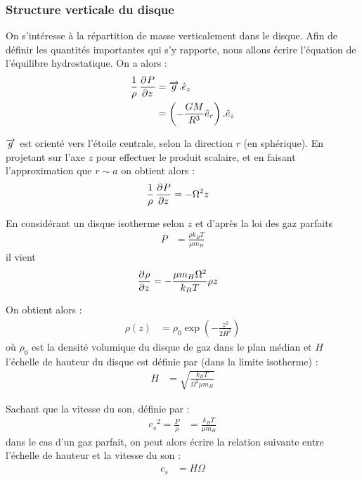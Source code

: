 \subsubsection{Structure verticale du disque}
On s'intéresse à la répartition de masse verticalement dans le disque. Afin de définir les quantités importantes qui s'y rapporte, nous allons écrire l'équation de l'équilibre hydrostatique. On a alors :
\begin{align}
\frac{1}{\rho}\mathinner{ \dfrac{\partial{^{}}P}{\partial{{z}^{}}} } &= {\overrightarrow{g}}.\hat{e}_z\\
&= \left(-\frac{GM}{R^3}\hat{e}_r\right).\hat{e}_z
\end{align}

${\overrightarrow{g}}$ est orienté vers l'étoile centrale, selon la direction $r$ (en sphérique). En projetant sur l'axe $z$ pour effectuer le produit scalaire, et en faisant l'approximation que $r\sim a$ on obtient alors :
\begin{align}
\frac{1}{\rho}\mathinner{ \dfrac{\partial{^{}}P}{\partial{{z}^{}}} } &= -\Omega^2 z
\end{align}

En considérant un disque isotherme selon $z$ et d'après la loi des gaz parfaits
\begin{align}
P &= \frac{\rho k_B T}{\mu m_H}
\end{align}
il vient
\begin{align}
\mathinner{ \dfrac{\partial{^{}}\rho}{\partial{{z}^{}}} } &= -\frac{\mu m_H\Omega^2}{k_B T}\rho z
\end{align}

On obtient alors :
\begin{align}
\rho(z) &= \rho_0\exp\left(-\frac{z^2}{2H^2}\right)
\end{align}
où $\rho_0$ est la densité volumique du disque de gaz dans le plan médian et $H$ l'échelle de hauteur du disque est définie par (dans la limite isotherme) : 
\begin{align}
H &= \sqrt{\frac{k_B T}{\Omega^2 \mu m_H}}
\end{align}

\bigskip

Sachant que la vitesse du son, définie par :
\begin{align}
{c_s}^2=\frac{P}{\rho} &= \frac{k_B T}{\mu m_H}
\end{align}
dans le cas d'un gaz parfait, on peut alors écrire la relation suivante entre l'échelle de hauteur et la vitesse du son : 
\begin{align}
c_s &= H\Omega
\end{align}

\bigskip

